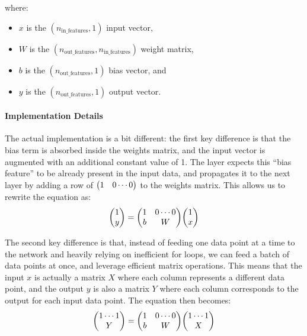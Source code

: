 where:
\begin{itemize}
    \item $x$ is the $(n_{\text{in\_features}}, 1)$ input vector,
    \item $W$ is the $(n_{\text{out\_features}}, n_{\text{in\_features}})$ weight matrix,
    \item $b$ is the $(n_{\text{out\_features}}, 1)$ bias vector, and
    \item $y$ is the $(n_{\text{out\_features}}, 1)$ output vector.
\end{itemize}

\paragraph{Implementation Details} The actual implementation is a bit different: the first key difference is that the bias term is absorbed inside the weights matrix, and the input vector is augmented with an additional constant value of 1. The layer expects this ``bias feature'' to be already present in the input data, and propagates it to the next layer by adding a row of $\mqty(1 & 0 \cdots 0)$ to the weights matrix. This allows us to rewrite the equation as:
\begin{equation}
    \mqty( 1 \\ y ) = \mqty( 1 & 0 \cdots 0 \\ b & W ) \mqty( 1 \\ x )
\end{equation}

The second key difference is that, instead of feeding one data point at a time to the network and heavily relying on inefficient for loops, we can feed a batch of data points at once, and leverage efficient matrix operations. This means that the input $x$ is actually a matrix $X$ where each column represents a different data point, and the output $y$ is also a matrix $Y$ where each column corresponds to the output for each input data point. The equation then becomes:
\begin{equation}
    \mqty( 1 \cdots 1 \\ Y ) = \mqty( 1 & 0 \cdots 0 \\ b & W ) \mqty( 1 \cdots 1 \\ X )
\end{equation}

